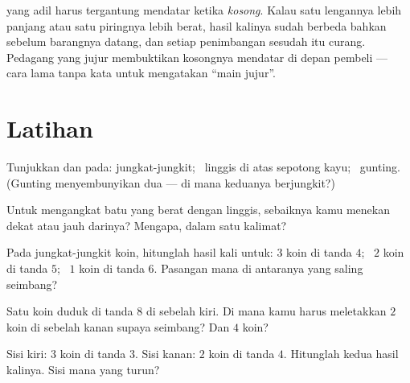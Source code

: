 \begin{remark}\label{rem:g3:levers-and-scales:fair}
 yang adil harus tergantung mendatar ketika \emph{kosong}. Kalau
satu lengannya lebih panjang atau satu piringnya lebih berat, hasil
kalinya sudah berbeda bahkan sebelum barangnya datang, dan setiap
penimbangan sesudah itu curang. Pedagang yang jujur membuktikan 
kosongnya mendatar di depan pembeli --- cara lama tanpa kata untuk
mengatakan ``main jujur''.
\end{remark}

\section{Latihan}

\begin{exercise}[$\star$]\label{exo:g3:levers-and-scales:1}
Tunjukkan  dan  pada: jungkat-jungkit; \ linggis di
atas sepotong kayu; \ gunting. (Gunting menyembunyikan dua  --- di
mana keduanya berjungkit?)
\end{exercise}

\begin{exercise}[$\star$]\label{exo:g3:levers-and-scales:2}
Untuk mengangkat batu yang berat dengan linggis, sebaiknya kamu
menekan dekat  atau jauh darinya? Mengapa, dalam satu
kalimat?
\end{exercise}

\begin{exercise}[$\star$]\label{exo:g3:levers-and-scales:3}
Pada jungkat-jungkit koin, hitunglah hasil kali untuk: $3$ koin di
tanda $4$; \ $2$ koin di tanda $5$; \ $1$ koin di tanda $6$. Pasangan
mana di antaranya yang saling seimbang?
\end{exercise}

\begin{exercise}[$\star$]\label{exo:g3:levers-and-scales:4}
Satu koin duduk di tanda $8$ di sebelah kiri. Di mana kamu harus
meletakkan $2$ koin di sebelah kanan supaya seimbang? Dan $4$ koin?
\end{exercise}

\begin{exercise}[$\star$]\label{exo:g3:levers-and-scales:5}
Sisi kiri: $3$ koin di tanda $3$. Sisi kanan: $2$ koin di tanda $4$.
Hitunglah kedua hasil kalinya. Sisi mana yang turun?
\end{exercise}

